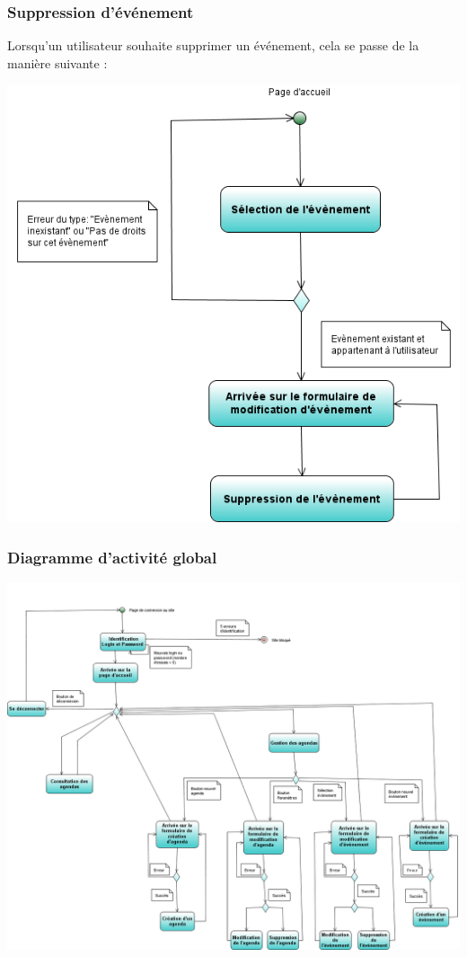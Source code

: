 \documentclass[12pt , a4paper]{article}
\begin{document}
\subsubsection{Suppression d'événement}
\noindent Lorsqu'un utilisateur souhaite supprimer un événement, cela se passe de la manière suivante :
\begin{center}
  \includegraphics[scale=0.6]{./images/diag_act_suppression_evenement.png}
\end{center}

\begin{landscape}
\subsubsection{Diagramme d'activité global}
\begin{center}
  \includegraphics[scale=0.45]{./images/diag_activite.png}
\end{center}
\end{landscape}
\end{document}
